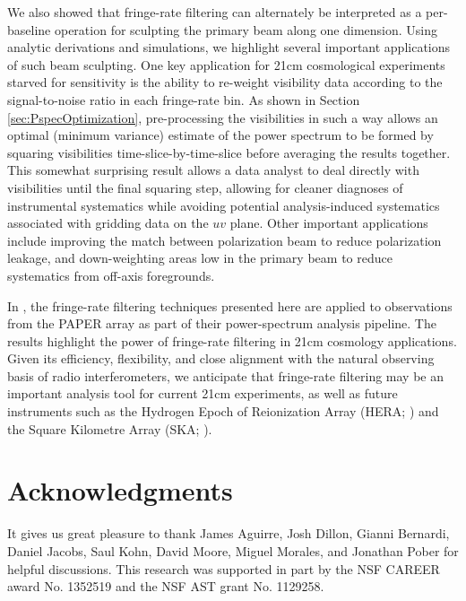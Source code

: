 \documentclass[twocolumn,apj,numberedappendix]{emulateapj}
\begin{document}
We also showed that fringe-rate filtering can alternately be interpreted as a per-baseline
operation for sculpting the primary beam along one dimension.
Using analytic
derivations and simulations, we highlight several important applications of such beam
sculpting.  One key application for 21cm cosmological experiments starved for sensitivity
is the ability to re-weight visibility data according to the signal-to-noise ratio in each fringe-rate bin.
As shown in Section \ref{sec:PspecOptimization}, pre-processing the visibilities in such a way
allows an optimal (minimum variance) estimate of the power spectrum to be formed by
squaring visibilities time-slice-by-time-slice before averaging the results together. This
somewhat surprising result allows a data analyst to deal directly with visibilities until
the final squaring step, allowing for cleaner diagnoses of instrumental systematics while
avoiding potential analysis-induced systematics associated with gridding data on the $uv$ plane.
%
Other important applications include improving the match between polarization beam to
reduce polarization leakage, and down-weighting areas low in the primary beam
to reduce systematics from off-axis foregrounds.

In \citet{ali_et_al2015}, the fringe-rate filtering techniques presented here are applied to
observations from the PAPER array as part of their power-spectrum analysis pipeline.  The
results highlight the power of fringe-rate filtering in 21cm cosmology applications.
Given its efficiency, flexibility, and close alignment with the natural observing
basis of radio interferometers, we anticipate that fringe-rate filtering may be
an important analysis tool for current 21cm experiments, as well as future instruments
such as the Hydrogen Epoch of Reionization Array (HERA; \citealt{pober_et_al2014}) and
the Square Kilometre Array (SKA; \citealt{carilli2014}).


\section{Acknowledgments}

It gives us great pleasure to thank James Aguirre, Josh Dillon, Gianni Bernardi, Daniel Jacobs, Saul Kohn, David Moore, 
Miguel Morales, and Jonathan Pober for helpful discussions.  
This research was supported in part by the NSF CAREER award No. 1352519 and the NSF AST grant No. 1129258.




\end{document}
